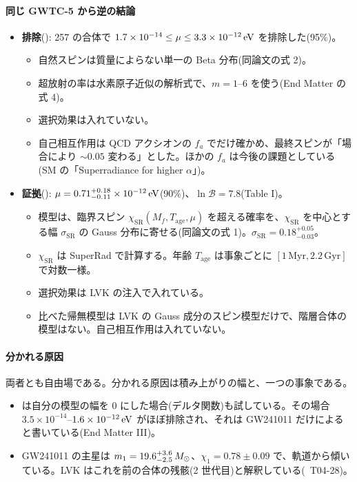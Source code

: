 \paragraph{同じ GWTC-5 から逆の結論}
\begin{itemize}
\item \textbf{排除}(): 257 の合体で $1.7\times10^{-14}\le\mu\le3.3\times10^{-12}\,\mathrm{eV}$ を排除した(95\%)。
  \begin{itemize}
  \item 自然スピンは質量によらない単一の Beta 分布(同論文の式 2)。
  \item 超放射の率は水素原子近似の解析式で、$m=1$--6 を使う(End Matter の式 4)。
  \item 選択効果は入れていない。
  \item 自己相互作用は QCD アクシオンの $f_a$ でだけ確かめ、最終スピンが「場合により $\sim0.05$ 変わる」とした。ほかの $f_a$ は今後の課題としている(SM の「Superradiance for higher $\alpha$」)。
  \end{itemize}
\item \textbf{証拠}(): $\mu=0.71^{+0.18}_{-0.11}\times10^{-12}\,\mathrm{eV}$(90\%)、$\ln\mathcal{B}=7.8$(Table I)。
  \begin{itemize}
  \item 模型は、臨界スピン $\chi_\mathrm{SR}(M_f,T_\mathrm{age},\mu)$ を超える確率を、$\chi_\mathrm{SR}$ を中心とする幅 $\sigma_\mathrm{SR}$ の Gauss 分布に寄せる(同論文の式 1)。$\sigma_\mathrm{SR}=0.18^{+0.05}_{-0.03}$。
  \item $\chi_\mathrm{SR}$ は SuperRad で計算する。年齢 $T_\mathrm{age}$ は事象ごとに $[1\,\mathrm{Myr},2.2\,\mathrm{Gyr}]$ で対数一様。
  \item 選択効果は LVK の注入で入れている。
  \item 比べた帰無模型は LVK の Gauss 成分のスピン模型だけで、階層合体の模型はない。自己相互作用は入れていない。
  \end{itemize}
\end{itemize}

\paragraph{分かれる原因}
両者とも自由場である。分かれる原因は積み上がりの幅と、一つの事象である。
\begin{itemize}
\item {} は自分の模型の幅を 0 にした場合(デルタ関数)も試している。その場合 $3.5\times10^{-14}$--$1.6\times10^{-12}\,\mathrm{eV}$ がほぼ排除され、それは GW241011 だけによると書いている(End Matter III)。
\item GW241011 の主星は $m_1=19.6^{+3.6}_{-2.5}\,M_\odot$、$\chi_1=0.78\pm0.09$ で、軌道から傾いている。LVK はこれを前の合体の残骸(2 世代目)と解釈している(\review\ T04-28)。
\end{itemize}

